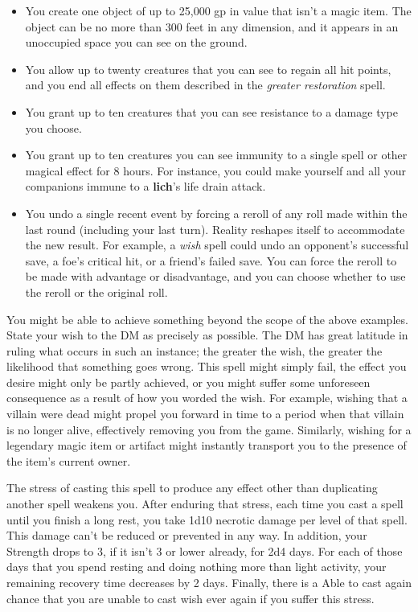 \documentclass[10pt,a4paper,twoside,bg=print,twocolumn,openany,nodeprecatedcode]{dndbook}
\begin{document}
\begin{itemize}
\item You create one object of up to 25,000 gp in value that isn't a magic item. The object can be no more than 300 feet in any dimension, and it appears in an unoccupied space you can see on the ground.
\item You allow up to twenty creatures that you can see to regain all hit points, and you end all effects on them described in the \textit{greater restoration} spell.
\item You grant up to ten creatures that you can see resistance to a damage type you choose.
\item You grant up to ten creatures you can see immunity to a single spell or other magical effect for 8 hours. For instance, you could make yourself and all your companions immune to a \textbf{lich}'s life drain attack.
\item You undo a single recent event by forcing a reroll of any roll made within the last round (including your last turn). Reality reshapes itself to accommodate the new result. For example, a \textit{wish} spell could undo an opponent's successful save, a foe's critical hit, or a friend's failed save. You can force the reroll to be made with advantage or disadvantage, and you can choose whether to use the reroll or the original roll.
\end{itemize}

You might be able to achieve something beyond the scope of the above examples. State your wish to the DM as precisely as possible. The DM has great latitude in ruling what occurs in such an instance; the greater the wish, the greater the likelihood that something goes wrong. This spell might simply fail, the effect you desire might only be partly achieved, or you might suffer some unforeseen consequence as a result of how you worded the wish. For example, wishing that a villain were dead might propel you forward in time to a period when that villain is no longer alive, effectively removing you from the game. Similarly, wishing for a legendary magic item or artifact might instantly transport you to the presence of the item's current owner.

The stress of casting this spell to produce any effect other than duplicating another spell weakens you. After enduring that stress, each time you cast a spell until you finish a long rest, you take 1d10 necrotic damage per level of that spell. This damage can't be reduced or prevented in any way. In addition, your Strength drops to 3, if it isn't 3 or lower already, for 2d4 days. For each of those days that you spend resting and doing nothing more than light activity, your remaining recovery time decreases by 2 days. Finally, there is a Able to cast again chance that you are unable to cast wish ever again if you suffer this stress.
\end{document}
